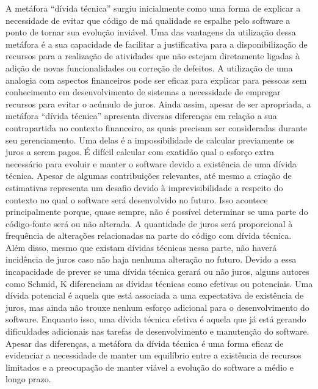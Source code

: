 A metáfora ``dívida técnica'' surgiu inicialmente como uma forma de explicar a necessidade de evitar que código de má qualidade se espalhe pelo software a ponto de tornar sua evolução inviável\cite{cunningham1993wycash}. Uma das vantagens da utilização dessa metáfora é a sua capacidade de facilitar a justificativa para a disponibilização de recursos para a realização de atividades que não estejam diretamente ligadas à adição de novas funcionalidades ou correção de defeitos.  A utilização de uma analogia com aspectos financeiros pode ser eficaz para explicar para pessoas sem conhecimento em desenvolvimento de sistemas a necessidade de empregar recursos para evitar o acúmulo de juros. Ainda assim,  apesar de ser apropriada, a metáfora ``dívida técnica'' apresenta diversas diferenças em relação a sua contrapartida no contexto financeiro, as quais precisam ser consideradas durante seu gerenciamento. Uma delas é a impossibilidade de calcular previamente os juros a serem pagos. É difícil calcular com exatidão qual o esforço extra necessário para evoluir e manter o software devido a existência de uma dívida técnica. Apesar de algumas contribuições relevantes\cite{singh2014framework,seaman2011measuring,curtis2012estimating}, até mesmo a criação de estimativas representa um desafio devido à imprevisibilidade a respeito do contexto no qual o software será desenvolvido no futuro. Isso acontece principalmente porque, quase sempre, não é possível determinar se uma parte do código-fonte será ou não alterada. A quantidade de juros será proporcional à frequência de alterações relacionadas na parte do código com dívida técnica. Além disso, mesmo que existam dívidas técnicas nessa parte, não haverá incidência de juros caso não haja nenhuma alteração no futuro. Devido a essa incapacidade de prever se uma dívida técnica gerará ou não juros, alguns autores como Schmid, K\cite{schmid2013limits} diferenciam as dívidas técnicas como efetivas ou potenciais. Uma dívida potencial é aquela que está associada a uma expectativa de  existência de juros, mas ainda não trouxe nenhum esforço adicional para o desenvolvimento do software. Enquanto isso, uma dívida técnica efetiva é aquela que já está gerando dificuldades adicionais nas tarefas de desenvolvimento e manutenção do software. Apesar das diferenças, a metáfora da dívida técnica é uma forma eficaz de evidenciar a necessidade de manter um equilíbrio entre a existência de recursos limitados e a preocupação de manter viável a evolução do software a médio e longo prazo.



